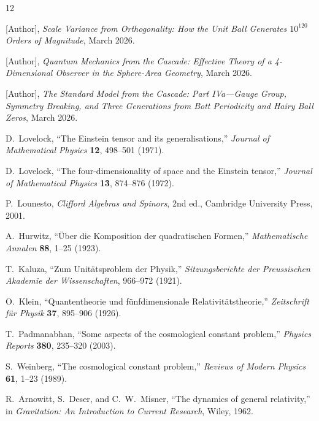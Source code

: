 \documentclass[12pt,a4paper]{article}
\begin{document}
\begin{thebibliography}{12}

 {[Author]}, \textit{Scale Variance from Orthogonality: How the Unit Ball Generates $10^{120}$ Orders of Magnitude}, March 2026.

 {[Author]}, \textit{Quantum Mechanics from the Cascade: Effective Theory of a 4-Dimensional Observer in the Sphere-Area Geometry}, March 2026.

 {[Author]}, \textit{The Standard Model from the Cascade: Part IVa---Gauge Group, Symmetry Breaking, and Three Generations from Bott Periodicity and Hairy Ball Zeros}, March 2026.

 D.~Lovelock, ``The Einstein tensor and its generalisations,'' \textit{Journal of Mathematical Physics} \textbf{12}, 498--501 (1971).

 D.~Lovelock, ``The four-dimensionality of space and the Einstein tensor,'' \textit{Journal of Mathematical Physics} \textbf{13}, 874--876 (1972).

 P.~Lounesto, \textit{Clifford Algebras and Spinors}, 2nd ed., Cambridge University Press, 2001.

 A.~Hurwitz, ``\"Uber die Komposition der quadratischen Formen,'' \textit{Mathematische Annalen} \textbf{88}, 1--25 (1923).

 T.~Kaluza, ``Zum Unit\"atsproblem der Physik,'' \textit{Sitzungsberichte der Preussischen Akademie der Wissenschaften}, 966--972 (1921).

 O.~Klein, ``Quantentheorie und f\"unfdimensionale Relativit\"atstheorie,'' \textit{Zeitschrift f\"ur Physik} \textbf{37}, 895--906 (1926).

 T.~Padmanabhan, ``Some aspects of the cosmological constant problem,'' \textit{Physics Reports} \textbf{380}, 235--320 (2003).

 S.~Weinberg, ``The cosmological constant problem,'' \textit{Reviews of Modern Physics} \textbf{61}, 1--23 (1989).

 R.~Arnowitt, S.~Deser, and C.~W.~Misner, ``The dynamics of general relativity,'' in \textit{Gravitation: An Introduction to Current Research}, Wiley, 1962.

\end{thebibliography}
\end{document}
